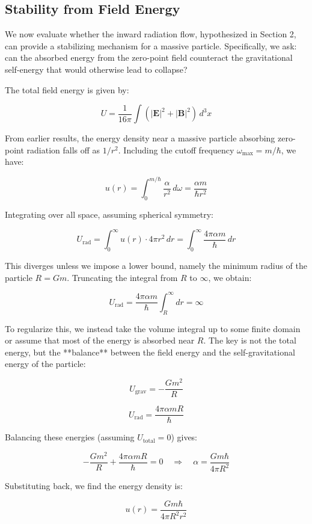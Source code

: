 \documentclass {article}
\renewcommand\vec{\mathbf}
\begin{document}
\subsection{Stability from Field Energy}

We now evaluate whether the inward radiation flow, hypothesized in Section 2, can provide a stabilizing mechanism for a massive particle. Specifically, we ask: can the absorbed energy from the zero-point field counteract the gravitational self-energy that would otherwise lead to collapse?

The total field energy is given by:

\[
U = \frac{1}{16\pi} \int \left( |\vec{E}|^2 + |\vec{B}|^2 \right) \, d^3x
\]

From earlier results, the energy density near a massive particle absorbing zero-point radiation falls off as \(1/r^2\). Including the cutoff frequency \(\omega_{\text{max}} = m/\hbar\), we have:

\[
u(r) = \int_0^{m/\hbar} \frac{\alpha}{r^2} \, d\omega = \frac{\alpha m}{\hbar r^2}
\]

Integrating over all space, assuming spherical symmetry:

\[
U_{\text{rad}} = \int_0^\infty u(r) \cdot 4\pi r^2 \, dr = \int_0^\infty \frac{4\pi \alpha m}{\hbar} \, dr
\]

This diverges unless we impose a lower bound, namely the minimum radius of the particle \(R = Gm\). Truncating the integral from \(R\) to \(\infty\), we obtain:

\[
U_{\text{rad}} = \frac{4\pi \alpha m}{\hbar} \int_R^\infty dr = \infty
\]

To regularize this, we instead take the volume integral up to some finite domain or assume that most of the energy is absorbed near \(R\). The key is not the total energy, but the **balance** between the field energy and the self-gravitational energy of the particle:

\[
U_{\text{grav}} = -\frac{G m^2}{R}
\]

\[
U_{\text{rad}} = \frac{4\pi \alpha m R}{\hbar}
\]

Balancing these energies (assuming \(U_{\text{total}} = 0\)) gives:

\[
-\frac{G m^2}{R} + \frac{4\pi \alpha m R}{\hbar} = 0 \quad \Rightarrow \quad \alpha = \frac{G m \hbar}{4 \pi R^2}
\]

Substituting back, we find the energy density is:

\[
u(r) = \frac{G m \hbar}{4\pi R^2 r^2}
\]
\end{document}

